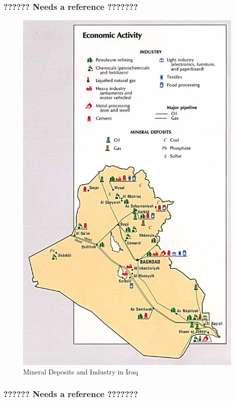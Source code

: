 \documentclass{report}
\begin{document}
\subsubsection{??????  Needs a reference   ???????}

\begin{figure}[H]
 \centering
 \includegraphics[trim = 0cm 0cm 0cm 0cm, clip,scale=.7]{./figures/minerals.jpg}
   \caption{Mineral Deposits and Industry in Iraq}
     \label{fig:minerals}
\end{figure}



\subsubsection{??????  Needs a reference   ???????}
\end{document}
